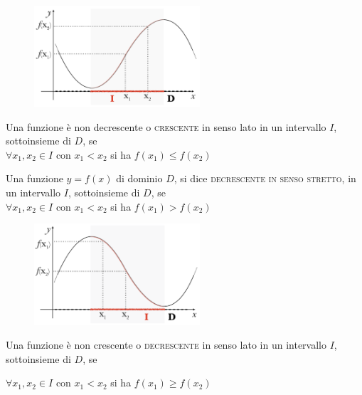 \begin{figure}[htpb!]
  \centering
  \includegraphics[width=0.55\textwidth]{img/funz_6.png}
\end{figure}
%
\begin{definizione}
Una funzione è non decrescente o \textsc{crescente} in senso lato in un 
intervallo \(I\), sottoinsieme di \(D\), se\\

\(\forall x_1,x_2\in I\)  con \(x_1<x_2 \) si ha \(f(x_1)\leq f(x_2)\)\\
%
\end{definizione}


\begin{definizione}
Una funzione \(y=f(x)\) di dominio \(D\), si dice \textsc{decrescente in senso 
stretto}, in un intervallo \(I\), sottoinsieme di \(D\), se\\

\(\forall x_1,x_2\in I\)  con \(x_1<x_2 \) si ha \(f(x_1)> f(x_2)\)\\

\end{definizione}

\begin{figure}[htpb!]
  \centering
  \includegraphics[width=0.55\textwidth]{img/funz_7.png}
\end{figure}
%

\begin{definizione}
Una funzione è non crescente o \textsc{decrescente} in senso lato in un 
intervallo \(I\), sottoinsieme di \(D\), se

\(\forall x_1,x_2\in I\)  con \(x_1<x_2 \) si ha \(f(x_1)\geq f(x_2)\)\\
\end{definizione}

